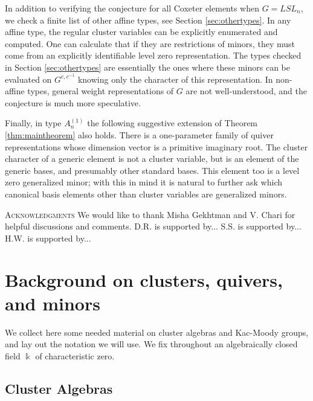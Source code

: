 \documentclass[12pt]{amsart}
\newcommand{\kk}{\Bbbk}%
\theoremstyle{remark}
\numberwithin{equation}{section}
\begin{document}
In addition to verifying the conjecture for all Coxeter elements when $G = LSL_n$, we check a finite list of other affine types, see Section \ref{sec:othertypes}. In any affine type, the regular cluster variables can be explicitly enumerated and computed. One can calculate that if they are restrictions of minors, they must come from an explicitly identifiable level zero representation. The types checked in Section \ref{sec:othertypes} are essentially the ones where these minors can be evaluated on $G^{c,c^{-1}}$ knowing only the character of this representation. In non-affine types, general weight representations of $G$ are not well-understood, and the conjecture is much more speculative.

Finally, in type $A_n^{(1)}$ the following suggestive extension of Theorem \ref{thm:maintheorem} also holds. There is a one-parameter family of quiver representations whose dimension vector is a primitive imaginary root. The cluster character of a generic element is not a cluster variable, but is an element of the generic bases, and presumably other standard bases. This element too is a level zero generalized minor; with this in mind it is natural to further ask which canonical basis elements other than cluster variables are generalized minors.

\textsc{Acknowledgments}  We would like to thank Misha Gekhtman and V. Chari for helpful discussions and comments. D.R. is supported by... S.S. is supported by... H.W. is supported by...

\section{Background on clusters, quivers, and minors}

We collect here some needed material on cluster algebras and Kac-Moody groups, and lay out the notation we will use.  
We fix throughout an algebraically closed field $\kk$ of characteristic zero. 

\subsection{Cluster Algebras}
\end{document}
